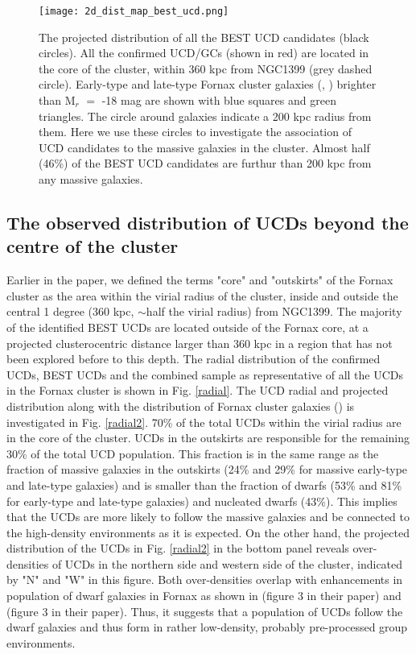 \documentclass[fleqn,usenatbib]{mnras}
\begin{document}
\begin{figure*}
\texttt{[image: 2d\_dist\_map\_best\_ucd.png]}
\caption{The projected distribution of all the BEST UCD candidates (black circles). All the confirmed UCD/GCs (shown in red) are located in the core of the cluster, within 360 kpc from NGC1399 (grey dashed circle). Early-type and late-type Fornax cluster galaxies (\citealp{venhola2018}, \citealp{fcc}) brighter than M$_r$ $=$ -18 mag are shown with blue squares and green triangles. The circle around galaxies indicate a 200 kpc radius from them. Here we use these circles to investigate the association of UCD candidates to the massive galaxies in the cluster. Almost half (46\%) of the BEST UCD candidates are furthur than 200 kpc from any massive galaxies.}
\label{2dbestucdmap}
\end{figure*}

\subsection{The observed distribution of UCDs beyond the centre of the cluster}

Earlier in the paper, we defined the terms "core" and "outskirts" of the Fornax cluster as the area within the virial radius of the cluster, inside and outside the central 1 degree (360 kpc, $\sim$half the virial radius) from NGC1399. The majority of the identified BEST UCDs are located outside of the Fornax core, at a projected clusterocentric distance larger than 360 kpc in a region that has not been explored before to this depth. The radial distribution of the confirmed UCDs, BEST UCDs and the combined sample as representative of all the UCDs in the Fornax cluster is shown in Fig. \ref{radial}. The UCD radial and projected distribution along with the distribution of Fornax cluster galaxies (\citealp{venhola2018}) is investigated in Fig. \ref{radial2}. 70\% of the total UCDs within the virial radius are in the core of the cluster. UCDs in the outskirts are responsible for the remaining 30\% of the total UCD population. This fraction is in the same range as the fraction of massive galaxies in the outskirts (24\% and 29\% for massive early-type and late-type galaxies) and is smaller than the fraction of dwarfs (53\% and 81\% for early-type and late-type galaxies) and nucleated dwarfs (43\%). This implies that the UCDs are more likely to follow the massive galaxies and be connected to the high-density environments as it is expected. On the other hand, the projected distribution of the UCDs in Fig. \ref{radial2} in the bottom panel reveals over-densities of UCDs in the northern side and western side of the cluster, indicated by "N" and "W" in this figure. Both over-densities overlap with enhancements in population of dwarf galaxies in Fornax as shown in \citet{venhola-2019} (figure 3 in their paper) and \citet{yasna2018-2} (figure 3 in their paper). Thus, it suggests that a population of UCDs follow the dwarf galaxies and thus form in rather low-density, probably pre-processed group environments.
\end{document}

